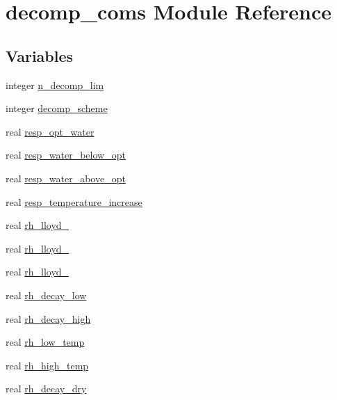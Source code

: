 \hypertarget{namespacedecomp__coms}{}\section{decomp\+\_\+coms Module Reference}
\label{namespacedecomp__coms}
\subsection*{Variables}
\begin{DoxyCompactItemize}
\item 
integer \hyperlink{namespacedecomp__coms_acc16e9b621eb378551411054e0eccd19}{n\+\_\+decomp\+\_\+lim}
\item 
integer \hyperlink{namespacedecomp__coms_a45f7f700d58a695c51acb5b70ad8df7a}{decomp\+\_\+scheme}
\item 
real \hyperlink{namespacedecomp__coms_a742e53482284fcb3d56bad3f0e9a6ce6}{resp\+\_\+opt\+\_\+water}
\item 
real \hyperlink{namespacedecomp__coms_ad0a89d5c04a58d5d856f23bf2a6fc673}{resp\+\_\+water\+\_\+below\+\_\+opt}
\item 
real \hyperlink{namespacedecomp__coms_ae65f5918ea1fd8476ba6fe08ba75338a}{resp\+\_\+water\+\_\+above\+\_\+opt}
\item 
real \hyperlink{namespacedecomp__coms_af7580578ade80e2ff8a83237e4bec847}{resp\+\_\+temperature\+\_\+increase}
\item 
real \hyperlink{namespacedecomp__coms_a2775159bda84d12f2b4da2e95e8fb433}{rh\+\_\+lloyd\+\_}
\item 
real \hyperlink{namespacedecomp__coms_ac5243babb339349c2d5663277c119dca}{rh\+\_\+lloyd\+\_}
\item 
real \hyperlink{namespacedecomp__coms_a73d41d57b6ba219cd24ba95523178524}{rh\+\_\+lloyd\+\_}
\item 
real \hyperlink{namespacedecomp__coms_a15da861431aeb575ca7b53fb4ba7972f}{rh\+\_\+decay\+\_\+low}
\item 
real \hyperlink{namespacedecomp__coms_a5306d3c9f7c12a69c48bf826d4b7bc31}{rh\+\_\+decay\+\_\+high}
\item 
real \hyperlink{namespacedecomp__coms_ac6c93f8adee77514ac222dd1f44f155b}{rh\+\_\+low\+\_\+temp}
\item 
real \hyperlink{namespacedecomp__coms_af9b557ce9c8f5946841c90f3c7e34ed9}{rh\+\_\+high\+\_\+temp}
\item 
real \hyperlink{namespacedecomp__coms_a861b2bcf03601249e52a185ebd1b8978}{rh\+\_\+decay\+\_\+dry}

\end{DoxyCompactItemize}

